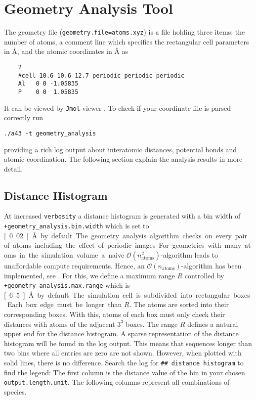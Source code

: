 \documentclass[oribibl]{llncs}
\newcommand{\um}[1]{_{\mathrm{#1}}}
\newcommand{\ttt}[1]{\texttt{#1}}
\begin{document}
\section{Geometry Analysis Tool} \label{sec:geometry-analysis}
%
The geometry file (\ttt{geometry.file=atoms.xyz}) is a file
holding three items:
the number of atoms, 
a comment line which specifies the rectangular cell parameters in \AA{}, 
and the atomic coordinates in \AA{} as
\begin{verbatim}
    2
    #cell 10.6 10.6 12.7 periodic periodic periodic
    Al   0 0 -1.05835
    P    0 0  1.05835
\end{verbatim}
It can be viewed by \ttt{Jmol}-viewer \cite{jmol-software}.
%
\noindent
To check if your coordinate file is parsed correctly run
\begin{verbatim}
./a43 -t geometry_analysis
\end{verbatim}
providing a rich log output about interatomic distances,
potential bonds and atomic coordination. The following section
explain the analysis results in more detail.

\subsection{Distance Histogram} \label{sec:distance-histogram}
%
At increased \ttt{verbosity} a distance histogram is generated with
a bin width of \ttt{+geometry\_analysis.bin.width} which is set to \unit[0.02]{\AA} by default.
The geometry analysis algorithm checks on every pair of atoms
including the effect of periodic images.
For geometries with many atoms in the simulation volume
a naive $\mathcal O(n\um{atoms}^2)$-algorithm 
leads to unaffordable compute requirements.
Hence, an $\mathcal O(n\um{atoms})$-algorithm has been implemented, see \cite{a43theory}.
For this, we define a maximum range $R$ controlled 
by \ttt{+geometry\_analysis.max.range} which is \unit[6.5]{\AA} by default.
The simulation cell is subdivided into rectangular boxes. 
Each box edge must be longer than $R$. 
The atoms are sorted into their corresponding boxes.
With this, atoms of each box must only check their distances 
with atoms of the adjacent $3^3$ boxes.
The range $R$ defines a natural upper end for the distance histogram.
A sparse representation of the distance histogram will be found in the log output.
This means that sequences longer than two bins where all entries are zero are not shown.
However, when plotted with solid lines, there is no difference.
Search the log for \ttt{\#\# distance histogram} to find the legend:
The first column is the distance value of the bin in your chosen \ttt{output.length.unit}.
The following columns represent all combinations of species.
\end{document}
